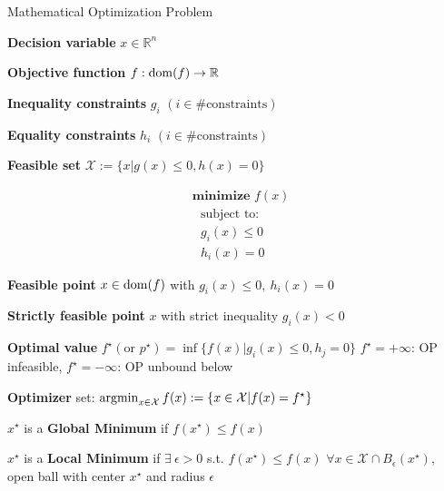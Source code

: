 
\begin{sstTitleBox}[Plum]{
    Mathematical Optimization Problem
  }
  \begin{minipage}{0.70\linewidth}
    \begin{sstOnlyFrame}[Plum]
      \textbf{Decision variable} $x  \in \mathbb{R}^{n}$

      \textbf{Objective function} $f: \operatorname{dom}(f)\to\mathbb{R}$

      \textbf{Inequality constraints} $g_i$
      $\scriptstyle(i \in \#\text{constraints})$

      \textbf{Equality constraints} $h_i$
      $\scriptstyle(i \in \#\text{constraints})$

      \textbf{Feasible set}
      $\mathcal{X}\!\!:=\!\!\{x|g(x)\!\!\le\!\!0,\!h(x)\!=\!0\}$
    \end{sstOnlyFrame}
  \end{minipage}
  \begin{minipage}{0.28\linewidth}
    \begin{sstFullFrame}[Plum]
      {\color{white}
        \vspace{-1mm}
        \[
          \begin{aligned}
            & \textbf{minimize }f(x)   \\
            & \ \ \ \text{subject to:} \\
            & \ \ \ g_i(x)  \le 0      \\
            & \ \ \ h_i(x)  = 0
        \end{aligned} \]
        \vspace{-1mm}
      }
    \end{sstFullFrame}
  \end{minipage}
  \begin{sstOnlyFrame}[Plum]
    \textbf{Feasible point}
    $x\in\operatorname{dom}(f)$ with
    $g_i(x)\le 0,\ h_i(x)=0$

    \textbf{Strictly feasible point}
    $x$ with strict inequality
    $g_i(x)<0$

    \textbf{Optimal value}
    $f^\star (\text{or } p^\star)=
    \inf\{f(x)|
    g_i(x)\le0,h_j=0 \}$
    $f^\star=+\infty$: OP infeasible,
    $f^\star=-\infty$: OP unbound below

    \textbf{Optimizer}
    set:
    $\operatorname{argmin}_{x \in \mathcal{X}} f(x):=
    \{ x\in\mathcal{X}|f(x)=f^\star\}$
  \end{sstOnlyFrame}
  \begin{sstOnlyFrame}[Plum]
    $x^\star$ is a \textbf{Global Minimum} if $f(x^\star)\leq f(x)$

    $x^\star$ is a \textbf{Local Minimum} if
    $\exists\ \epsilon > 0$ s.t.
    $f(x^\star)\leq f(x)$
    $\forall x \in \mathcal{X} \cap B_\epsilon(x^\star)$,
    open ball with center $x^\star$ and radius $\epsilon$
  \end{sstOnlyFrame}
\end{sstTitleBox}

